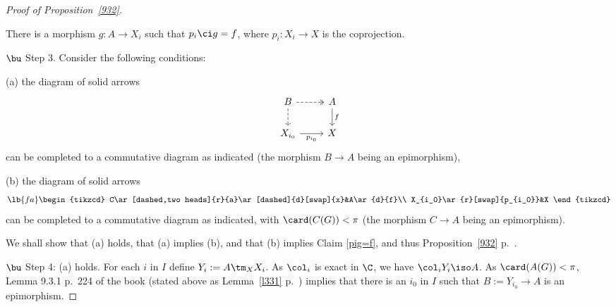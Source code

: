 \documentclass[12pt]{article}
\theoremstyle{remark}
\theoremstyle{definition}
\begin{document}
\begin{proof}[Proof of Proposition~\ref{932}]
\begin{claim} 
There is a morphism $g:A\to X_i$ such that $p_i\ci g=f$, where $p_i:X_i\to X$ is the coprojection.
\end{claim} 

\nn$\bu$ Step 3. Consider the following conditions: 

\nn(a) the diagram of solid arrows 
$$
\begin{tikzcd}
B\ar[dashed,two heads]{r}\ar[dashed]{d}&A\ar{d}{f}\\ 
X_{i_0}\ar{r}[swap]{p_{i_0}}&X
\end{tikzcd}
$$
can be completed to a commutative diagram as indicated (the morphism $B\to A$ being an epimorphism),

\nn(b) the diagram of solid arrows 
%
\begin{equation}\lb{fa}
\begin{tikzcd}
C\ar[dashed,two heads]{r}{a}\ar[dashed]{d}[swap]{x}&A\ar{d}{f}\\ 
X_{i_0}\ar{r}[swap]{p_{i_0}}&X
\end{tikzcd}
\end{equation}
%
can be completed to a commutative diagram as indicated, with $\card(C(G))<\pi$ (the morphism $C\to A$ being an epimorphism).

We shall show that (a) holds, that (a) implies (b), and that (b) implies Claim \ref{pig=f}, and thus Proposition~\ref{932} p.~. 

\nn$\bu$ Step 4: (a) holds. For each $i$ in $I$ define $Y_i:=A\tm_XX_i$. As $\col_i$ is exact in $\C$, we have $\col_iY_i\iso A$. As $\card(A(G))<\pi$, Lemma 9.3.1 p.~224 of the book (stated above as Lemma~\ref{l331} p.~) implies that there is an $i_0$ in $I$ such that $B:=Y_{i_0}\to A$ is an epimorphism.


\end{proof}
\end{document}
